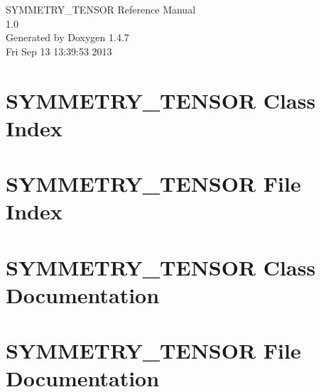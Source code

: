 \documentclass[a4paper]{book}
\begin{document}
\begin{titlepage}
\vspace*{7cm}
\begin{center}
{\Large SYMMETRY\_\-TENSOR Reference Manual\\[1ex]\large 1.0 }\\
\vspace*{1cm}
{\large Generated by Doxygen 1.4.7}\\
\vspace*{0.5cm}
{\small Fri Sep 13 13:39:53 2013}\\
\end{center}
\end{titlepage}
\clearemptydoublepage
{}
\tableofcontents
\clearemptydoublepage
{}
\chapter{SYMMETRY\_\-TENSOR Class Index}

\chapter{SYMMETRY\_\-TENSOR File Index}

\chapter{SYMMETRY\_\-TENSOR Class Documentation}


\chapter{SYMMETRY\_\-TENSOR File Documentation}


\printindex
\end{document}
